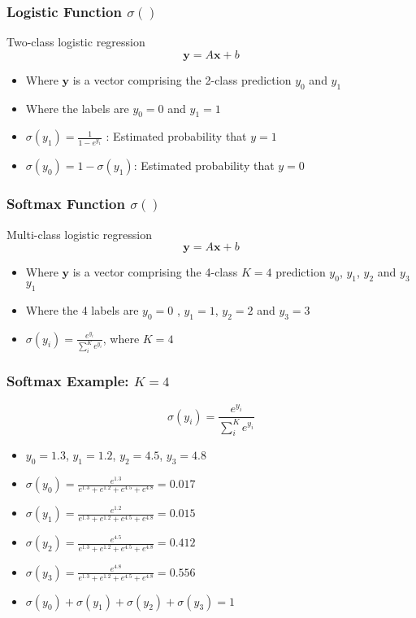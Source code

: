 \documentclass[14 pt]{beamer}
\let\olditem\item
\renewcommand{\item}{\olditem\vspace{4pt}}
\begin{document}
\begin{frame}
  \frametitle{Logistic Function $\sigma()$}
  Two-class logistic regression
  \begin{displaymath}
    \mathbf{y} = A\mathbf{x} + b
  \end{displaymath}
  \begin{itemize}
  \item Where $\mathbf{y}$ is a vector comprising the 2-class prediction $y_0$ and
    $y_1$
  \item Where the labels are $y_0 = 0$ and $y_1 = 1$
  \item $\sigma(y_1)=\frac{1}{1-e^{y_1}}$ : Estimated probability that $y = 1$
    
  \item $\sigma(y_0) = 1 - \sigma(y_1)$: Estimated probability that $y = 0$
  \end{itemize}
\end{frame}

\begin{frame}
  \frametitle{Softmax Function $\sigma()$}
  Multi-class logistic regression
  \begin{displaymath}
    \mathbf{y} = A\mathbf{x} + b
  \end{displaymath}
  \begin{itemize}
  \item Where $\mathbf{y}$ is a vector comprising the 4-class $K = 4$ prediction
    $y_0$, $y_1$, $y_2$  and $y_3$
    $y_1$
  \item Where the 4 labels are $y_0 = 0$ , $y_1 = 1$, $y_2 = 2$ and $y_3 =
    3$
  \item $\sigma(y_i) = \frac{e^{y_i}}{\sum_i^K e^{y_i}}$, where $K=4$
  \end{itemize}
\end{frame}

\begin{frame}
  \frametitle{Softmax Example: $K=4$}
  \begin{displaymath}
    \sigma(y_i) = \frac{e^{y_i}}{\sum_i^K e^{y_i}}
  \end{displaymath}
  \begin{itemize}
  \item $y_0 = 1.3$, $y_1 = 1.2$, $y_2 = 4.5$, $y_3 = 4.8$
  \item $\sigma(y_0) = \frac{e^{1.3}}{e^{1.3}+e^{1.2}+e^{4.5}+e^{4.8}} = 0.017$
  \item $\sigma(y_1) = \frac{e^{1.2}}{e^{1.3}+e^{1.2}+e^{4.5}+e^{4.8}} = 0.015$
  \item $\sigma(y_2) = \frac{e^{4.5}}{e^{1.3}+e^{1.2}+e^{4.5}+e^{4.8}} = 0.412$
  \item $\sigma(y_3) = \frac{e^{4.8}}{e^{1.3}+e^{1.2}+e^{4.5}+e^{4.8}} = 0.556$
  \item $\sigma(y_0)+\sigma(y_1)+\sigma(y_2)+\sigma(y_3) = 1$
  \end{itemize}
\end{frame}
\end{document}
